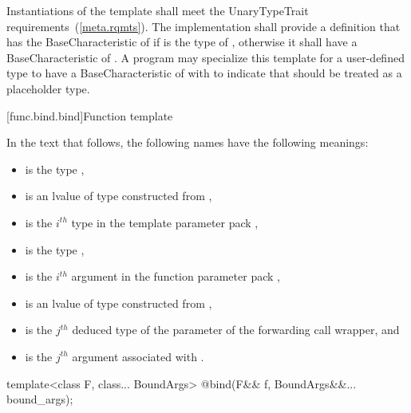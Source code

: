\pnum
Instantiations of the  template shall meet
the UnaryTypeTrait requirements~(\ref{meta.rqmts}). The implementation
shall provide a definition that has the BaseCharacteristic of
 if  is the type of
, otherwise it shall have a
BaseCharacteristic of . A program
may specialize this template for a user-defined type  to
have a BaseCharacteristic of 
with  to indicate that  should be
treated as a placeholder type.

[func.bind.bind]{Function template }

\pnum
In the text that follows, the following names have the following meanings:

\begin{itemize}
\item {} is the type ,
\item {} is an lvalue of type  constructed from ,
\item {} is the $i^{th}$ type in the template parameter pack ,
\item {} is the type ,
\item {} is the $i^{th}$ argument in the function parameter pack ,
\item {} is an lvalue of type  constructed from ,
\item {} is the $j^{th}$ deduced type of the  parameter
  of the forwarding call wrapper, and
\item {} is the $j^{th}$ argument associated with .
\end{itemize}

\begin{itemdecl}
template<class F, class... BoundArgs>
  @\unspec@ bind(F&& f, BoundArgs&&... bound_args);
\end{itemdecl}

